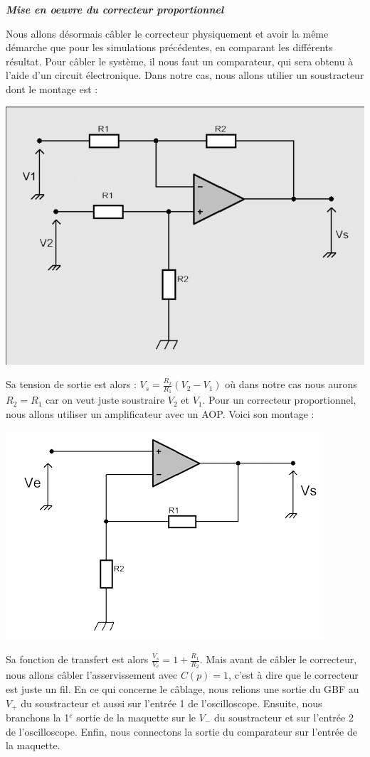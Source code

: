 \documentclass[12pt]{article}
\begin{document}
\large \textit{ \textbf{Mise en oeuvre du correcteur proportionnel}}

\normalsize Nous allons désormais câbler le correcteur physiquement et avoir la même démarche que pour les simulations précédentes, en comparant les différents résultat.
Pour câbler le système, il nous faut un comparateur, qui sera obtenu à l'aide d'un circuit électronique. Dans notre cas, nous allons utilier un soustracteur dont le montage est  :
\begin{center}
    \includegraphics[width = 10 cm]{TP3/soustracteur.png}
\end{center}
Sa tension de sortie est alors : $V_s = \frac{R_2}{R_1}(V_2-V_1)$ où dans notre cas nous aurons $R_2 = R_1$ car on veut juste soustraire $V_2$ et $V_1$.
Pour un correcteur proportionnel, nous allons utiliser un amplificateur avec un AOP. Voici son montage : 
\begin{center}
    \includegraphics[width = 10 cm]{TP3/ampli_non_inv.png}
\end{center}
Sa fonction de transfert est alors $\frac{V_s}{V_e} = 1 + \frac{R_1}{R_2}$. Mais avant de câbler le correcteur, nous allons câbler l'asservissement avec $C(p) = 1$, c'est à dire que le correcteur est juste un fil. 
En ce qui concerne le câblage, nous relions une sortie du GBF au $V_+$ du soustracteur et aussi sur l'entrée 1 de l'oscilloscope. Ensuite, nous branchons la 1$^{e}$ sortie de la maquette sur le $V_-$ du soustracteur et sur l'entrée 2 de l'oscilloscope. Enfin, nous connectons la sortie du comparateur sur l'entrée de la maquette.
\end{document}
